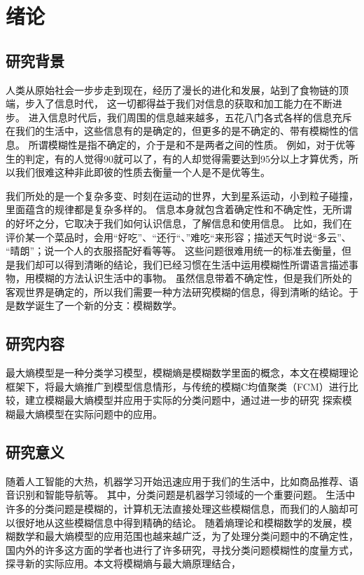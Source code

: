 \chapter[绪论]{绪论}
\section{研究背景}
\par
人类从原始社会一步步走到现在，经历了漫长的进化和发展，站到了食物链的顶端，步入了信息时代，
这一切都得益于我们对信息的获取和加工能力在不断进步。
进入信息时代后，我们周围的信息越来越多，五花八门各式各样的信息充斥在我们的生活中，这些信息有的是确定的，但更多的是不确定的、带有模糊性的信息。
所谓模糊性是指不确定的，介于是和不是两者之间的性质。
例如，对于优等生的判定，有的人觉得90就可以了，有的人却觉得需要达到95分以上才算优秀，所以我们很难这种非此即彼的性质去衡量一个人是不是优等生。
\par
我们所处的是一个复杂多变、时刻在运动的世界，大到星系运动，小到粒子碰撞，里面蕴含的规律都是复杂多样的。
信息本身就包含着确定性和不确定性，无所谓的好坏之分，它取决于我们如何认识信息，了解信息和使用信息。
比如，我们在评价某一个菜品时，会用“好吃”、“还行“、”难吃“来形容；描述天气时说“多云”、 “晴朗”；说一个人的衣服搭配好看等等。
这些问题很难用统一的标准去衡量，但是我们却可以得到清晰的结论，我们已经习惯在生活中运用模糊性所谓语言描述事物，用模糊的方法认识生活中的事物。
虽然信息带着不确定性，但是我们所处的客观世界是确定的，所以我们需要一种方法研究模糊的信息，得到清晰的结论。于是数学诞生了一个新的分支：模糊数学。

\section{研究内容}
最大熵模型是一种分类学习模型，模糊熵是模糊数学里面的概念，本文在模糊理论框架下，将最大熵推广到模型信息情形，与传统的模糊C均值聚类（FCM）进行比较，建立模糊最大熵模型并应用于实际的分类问题中，通过进一步的研究 探索模糊最大熵模型在实际问题中的应用。
\section{研究意义}
随着人工智能的大热，机器学习开始迅速应用于我们的生活中，比如商品推荐、语音识别和智能导航等。
其中，分类问题是机器学习领域的一个重要问题。
生活中许多的分类问题是模糊的，计算机无法直接处理这些模糊信息，而我们的人脑却可以很好地从这些模糊信息中得到精确的结论。
随着熵理论和模糊数学的发展，模糊数学和最大熵模型的应用范围也越来越广泛，为了处理分类问题中的不确定性，国内外的许多这方面的学者也进行了许多研究，寻找分类问题模糊性的度量方式，探寻新的实际应用。本文将模糊熵与最大熵原理结合，